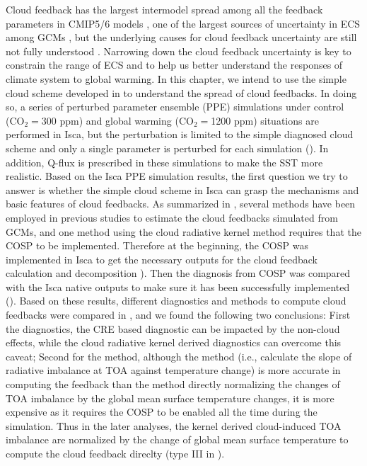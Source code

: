 Cloud feedback has the largest intermodel spread among all the feedback parameters in CMIP5/6 models \citep{Zelinka2020causes}, one of the largest sources of uncertainty in ECS among GCMs \citep{Stocker2013,Ceppi2017,Zelinka2020causes}, but the underlying causes for cloud feedback uncertainty are still not fully understood \citep[e.g.,][]{Bony2005,Vial2013,Qu2014,Qu2015positive,Webb2015,Zelinka2016insights,Geoffroy2017,Zelinka2020causes}. Narrowing down the cloud feedback uncertainty is key to constrain the range of ECS \citep[e.g.,][]{Myers2021,Ceppi2021observational} and to help us better understand the responses of climate system to global warming. In this chapter, we intend to use the simple cloud scheme developed in  to understand the spread of cloud feedbacks. In doing so, a series of perturbed parameter ensemble (PPE) simulations under control (CO$_2=$300 ppm) and global warming (CO$_2=$1200 ppm) situations are performed in Isca, but the perturbation is limited to the simple diagnosed cloud scheme and only a single parameter is perturbed for each simulation (). In addition, Q-flux is prescribed in these simulations to make the SST more realistic. 
Based on the Isca PPE simulation results, the first question we try to answer is whether the simple cloud scheme in Isca can grasp the mechanisms and basic features of cloud feedbacks. As summarized in , several methods have been employed in previous studies to estimate the cloud feedbacks simulated from GCMs, and one method using the cloud radiative kernel method \citep{Zelinka2012computing1,Zelinka2012computing2} requires that the COSP \citep{BodasSalcedo2011,Swales2018} to be implemented. Therefore at the beginning, the COSP was implemented in Isca to get the necessary outputs for the cloud feedback calculation and decomposition ). Then the diagnosis from COSP was compared with the Isca native outputs to make sure it has been successfully implemented (). Based on these results, different diagnostics and methods to compute cloud feedbacks were compared in , and we found the following two conclusions: First the diagnostics, the CRE based diagnostic can be impacted by the non-cloud effects, while the cloud radiative kernel derived diagnostics can overcome this caveat; Second for the method, although the \cite{Gregory2004} method (i.e., calculate the slope of radiative imbalance at TOA against temperature change) is more accurate in computing the feedback than the method directly normalizing the changes of TOA imbalance by the global mean surface temperature changes, it is more expensive as it requires the COSP to be enabled all the time during the simulation. Thus in the later analyses, the kernel derived cloud-induced TOA imbalance are normalized by the change of global mean surface temperature to compute the cloud feedback direclty (type III in ).

